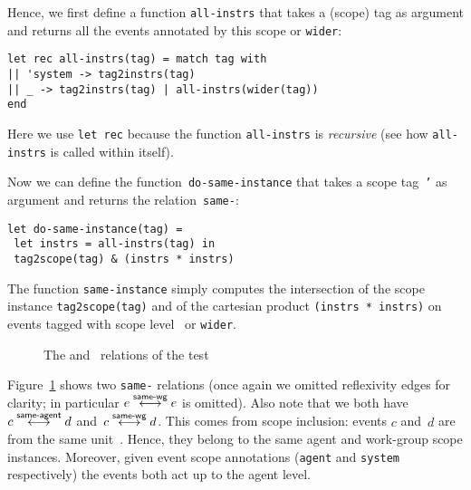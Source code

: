 Hence, we first define a function \texttt{all-instrs} that takes
a (scope) tag as argument and returns all the events annotated by
this scope or {\tt wider}:

\begin{verbatim}
let rec all-instrs(tag) = match tag with
|| 'system -> tag2instrs(tag)
|| _ -> tag2instrs(tag) | all-instrs(wider(tag))
end
\end{verbatim}

Here we use {\tt let rec} because the function {\tt all-instrs} is
\emph{recursive} (see how {\tt all-instrs} is called within itself).

Now we can define the function~\texttt{do-same-instance} that takes a scope
tag~\texttt{'} as argument and returns the
relation~\texttt{same-}:
\begin{verbatim}
let do-same-instance(tag) =
 let instrs = all-instrs(tag) in
 tag2scope(tag) & (instrs * instrs)
\end{verbatim}
The function {\tt same-instance} simply computes the intersection of the scope
instance {\tt tag2scope(tag)} and of the cartesian product {\tt (instrs *
instrs)} on events tagged with scope level~ or {\tt wider}.

\begin{figure}[!h]
\begin{center}\moveback
{}
\end{center}
\caption{\label{isa2same}The  and~ relations of the  test \color{green}{(Allowed)}}
\end{figure}
Figure~\ref{isa2same} shows two {\tt same-} relations (once again
we omitted reflexivity edges for clarity; in particular $e \stackrel{\textsf{\scriptsize{}same-wg}}{\longleftrightarrow} e$ is
omitted).  Also note that we both have $c \stackrel{\textsf{\scriptsize{}same-agent}}{\longleftrightarrow} d$ and~$c \stackrel{\textsf{\scriptsize{}same-wg}}{\longleftrightarrow} d$.
This comes from scope inclusion: events $c$ and~$d$ are from the same
unit~.  Hence, they belong to the same agent and work-group scope
instances.  Moreover, given event scope annotations (\texttt{agent} and
\texttt{system} respectively) the events both act up to the agent level.

%
%
%

